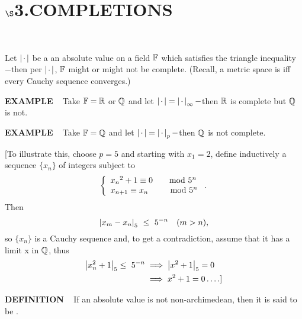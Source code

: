 \chapter{
$\boldsymbol{\S}$\textbf{3}.\quad  COMPLETIONS}
\setlength\parindent{2em}
\setcounter{theoremn}{0}

\ \indent 

Let $\left\vert\hspace{0.05cm} \cdot \hspace{0.05cm}\right\vert$  be a an absolute value on a field $\mathbb{F}$ which satisfies the triangle inequality $-$then per $\left\vert\hspace{0.05cm} \cdot \hspace{0.05cm}\right\vert$, $\mathbb{F}$ might or might not be complete. 
(Recall, a metric space is  iff every Cauchy sequence converges.)

\vspace{0.1cm}

\begin{x}{\small\bf EXAMPLE} \ %
Take $\mathbb{F} = \mathbb{R}$ or $\mathbb{Q}$ and let $\left\vert\hspace{0.05cm} \cdot \hspace{0.05cm}\right\vert = \left\vert\hspace{0.05cm} \cdot \hspace{0.05cm}\right\vert_\infty -$then $\mathbb{R}$ is complete but $\mathbb{Q}$ is not.
\end{x}

\vspace{0.1cm}

\begin{x}{\small\bf EXAMPLE} \ %
Take $\mathbb{F} =  \mathbb{Q}$ and let $\left\vert\hspace{0.05cm} \cdot \hspace{0.05cm}\right\vert = \left\vert\hspace{0.05cm} \cdot \hspace{0.05cm}\right\vert_p -$then $\mathbb{Q}$ is not complete.

\vspace{0.05cm}

[To illustrate this, choose $p = 5$ and starting with $x_1 = 2$, define inductively a sequence $\{x_n\}$ of integers subject to
\[\left\{
\begin{array}{l l}
{x_n}^2 + 1 \equiv 0	 \quad \text{ $\mod 5^n$ } \\
{x_{n+1}} \equiv x_n	 \quad \ \  \text{ $\mod 5^n$ }
\end{array}
.
\right.\]
Then
\[
\abs{x_m - x_n}_5  \ \le \ 5^{-n}		\quad (m > n),
\]
so $\{x_n\}$ is a Cauchy sequence and, to get a contradiction, assume that it has a limit x in $\mathbb{Q}$, thus
\[
\begin{aligned}
\left\vert x_n^2 + 1\right\vert_5 \le \  5^{-n} 
&\implies \left\vert x^2 + 1\right\vert_5 = 0 \\
&\implies x^2 + 1 = 0 \dots .] 
\end{aligned}
\]
\end{x}


\vspace{0.1cm}

\begin{x}{\small\bf DEFINITION} \ %
If an absolute value is not non-archimedean, then it is said to be .
\end{x}

